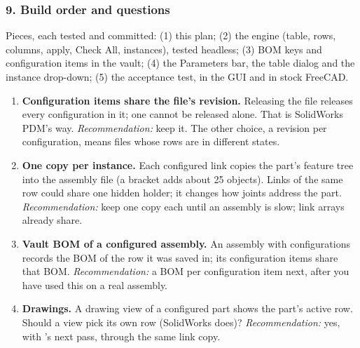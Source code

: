 \subsubsection*{9. Build order and questions}

Pieces, each tested and committed: (1) this plan; (2) the engine  (table,
rows, columns, apply, Check All, instances), tested headless; (3) BOM keys and configuration items in the
vault; (4) the Parameters bar, the table dialog and the instance drop-down; (5) the acceptance test, in the
GUI and in stock FreeCAD.

\begin{enumerate}
  \item \textbf{Configuration items share the file's revision.} Releasing the file releases every
        configuration in it; one cannot be released alone. That is SolidWorks PDM's way.
        \emph{Recommendation:} keep it. The other choice, a revision per configuration, means files whose
        rows are in different states.
  \item \textbf{One copy per instance.} Each configured link copies the part's feature tree into the
        assembly file (a bracket adds about 25 objects). Links of the same row could share one hidden
        holder; it changes how joints address the part. \emph{Recommendation:} keep one copy each until an
        assembly is slow; link arrays already share.
  \item \textbf{Vault BOM of a configured assembly.} An assembly with configurations records the BOM of the
        row it was saved in; its configuration items share that BOM. \emph{Recommendation:} a BOM per
        configuration item next, after you have used this on a real assembly.
  \item \textbf{Drawings.} A drawing view of a configured part shows the part's active row. Should a view
        pick its own row (SolidWorks does)? \emph{Recommendation:} yes, with 's next pass, through
        the same link copy.
\end{enumerate}
